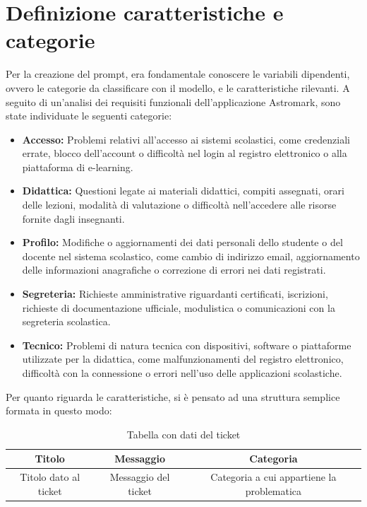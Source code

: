 \section{Definizione caratteristiche e categorie}
Per la creazione del prompt, era fondamentale conoscere le variabili dipendenti, ovvero le categorie da classificare con il modello, e le caratteristiche rilevanti. A seguito di un'analisi dei requisiti funzionali dell'applicazione Astromark, sono state individuate le seguenti categorie:
\begin{itemize}
    \item \textbf{Accesso:} Problemi relativi all'accesso ai sistemi scolastici, come credenziali errate, blocco dell'account o difficoltà nel login al registro elettronico o alla piattaforma di e-learning.
    \item \textbf{Didattica:} Questioni legate ai materiali didattici, compiti assegnati, orari delle lezioni, modalità di valutazione o difficoltà nell'accedere alle risorse fornite dagli insegnanti.
    \item \textbf{Profilo:} Modifiche o aggiornamenti dei dati personali dello studente o del docente nel sistema scolastico, come cambio di indirizzo email, aggiornamento delle informazioni anagrafiche o correzione di errori nei dati registrati.
    \item \textbf{Segreteria:}  Richieste amministrative riguardanti certificati, iscrizioni, richieste di documentazione ufficiale, modulistica o comunicazioni con la segreteria scolastica.
    \item \textbf{Tecnico:} Problemi di natura tecnica con dispositivi, software o piattaforme utilizzate per la didattica, come malfunzionamenti del registro elettronico, difficoltà con la connessione o errori nell'uso delle applicazioni scolastiche.
\end{itemize}
Per quanto riguarda le caratteristiche, si è pensato ad una struttura semplice formata in questo modo:
\begin{table}[h]
    \centering
    \begin{tabular}{|c|c|c|}
        \hline
        \textbf{Titolo} & \textbf{Messaggio} & \textbf{Categoria} \\
        \hline
        Titolo dato al ticket & Messaggio del ticket & Categoria a cui appartiene la problematica \\
        \hline
    \end{tabular}
    \caption{Tabella con dati del ticket}
    \label{tab:tickets}
\end{table}

